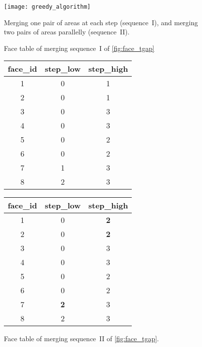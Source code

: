 \documentclass[ijgi,article,submit,moreauthors,pdftex]{Definitions/mdpi}
\begin{document}
\begin{figure}[tb]
\centering
\texttt{[image: greedy\_algorithm]}
\caption{Merging one pair of areas at each step (sequence~I), 
    and merging two pairs of areas parallelly (sequence~II).}
\label{fig:face_tgap}
\vspace{6mm} %
%
%
%
\captionsetup*{type=table} %
\parbox{.49\linewidth}{
\caption{Face table of merging sequence~I 
    of \fig\ref{fig:face_tgap}}
\label{tab:face_tgap}
\centering
\begin{tabular}{ccc}
\hline
face\_id &   step\_low   & step\_high    \\ \hline
1       &     0         &     1          \\
2       &     0         &     1          \\
3       &     0         &     3          \\ 
4       &     0         &     3          \\
5       &     0         &     2          \\
6       &     0         &     2          \\         
7       &     1         &     3          \\
8       &     2         &     3          \\ \hline
\end{tabular}
}
%
%
\parbox{.49\linewidth}{
\caption{Face table of merging sequence~II 
    of \fig\ref{fig:face_tgap}.
}
\label{tab:face_tgap_parallel}
\centering
\begin{tabular}{ccc}
\hline
face\_id &   step\_low   & step\_high    \\ \hline
1       &     0         & \textbf{2}          \\
2       &     0         & \textbf{2}          \\
3       &     0         &     3          \\ 
4       &     0         &     3          \\
5       &     0         &     2          \\
6       &     0         &     2          \\         
7       &  \textbf{2}   &     3          \\
8       &     2         &     3          \\ \hline
\end{tabular}
}
\end{figure}
\end{document}
